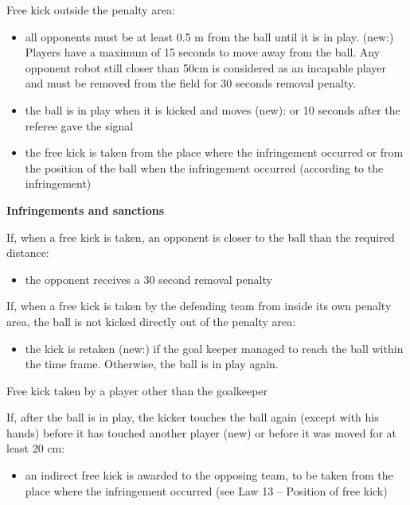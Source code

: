 {\bigskip

Free kick outside the penalty area:

\begin{itemize}
\item all opponents must be at least 0.5 m from the ball until it is in play. (new:) Players have a maximum of 15 seconds to move away from the ball. Any opponent robot still closer than 50cm is considered as an incapable player and must be removed from the field for 30 seconds removal penalty.
\item the ball is in play when it is kicked and moves (new): or 10 seconds after the referee gave the signal
\item the free kick is taken from the place where the infringement occurred or from the position of the ball when the infringement occurred (according to the infringement)
\end{itemize}

\bigskip

{\bfseries Infringements and sanctions}

\headlinebox

If, when a free kick is taken, an opponent is closer to the ball than the required distance:

\begin{itemize}
\item the opponent receives a 30 second removal penalty 
\end{itemize}

If, when a free kick is taken by the defending team from inside its own penalty area, the ball is not kicked directly out of the penalty area:


\begin{itemize}
\item the kick is retaken (new:) if the goal keeper managed to reach the ball within the time frame. Otherwise, the ball is in play again.
\end{itemize}

\bigskip

Free kick taken by a player other than the goalkeeper

If, after the ball is in play, the kicker touches the ball again (except with his hands) before it has touched another player (new) or before it was moved for at least 20 cm:

\begin{itemize}
\item an indirect free kick is awarded to the opposing team, to be taken from the place where the infringement occurred (see Law 13 -- Position of free kick)
\end{itemize}

}
